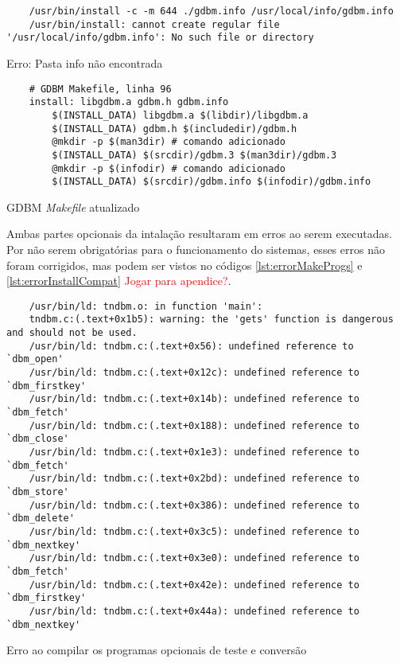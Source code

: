 \begin{listing}[!ht]
    \begin{verbatim}
    /usr/bin/install -c -m 644 ./gdbm.info /usr/local/info/gdbm.info
    /usr/bin/install: cannot create regular file '/usr/local/info/gdbm.info': No such file or directory
    \end{verbatim}
\caption{Erro: Pasta info não encontrada}
\label{lst:gdbmInfoErr}
\end{listing}

\begin{listing}[!ht]
    \begin{verbatim}
    # GDBM Makefile, linha 96
    install: libgdbm.a gdbm.h gdbm.info
        $(INSTALL_DATA) libgdbm.a $(libdir)/libgdbm.a
        $(INSTALL_DATA) gdbm.h $(includedir)/gdbm.h
        @mkdir -p $(man3dir) # comando adicionado
        $(INSTALL_DATA) $(srcdir)/gdbm.3 $(man3dir)/gdbm.3
        @mkdir -p $(infodir) # comando adicionado
        $(INSTALL_DATA) $(srcdir)/gdbm.info $(infodir)/gdbm.info
    \end{verbatim}
\caption{GDBM \textit{Makefile} atualizado}
\label{lst:gdbmMakefileUpt}
\end{listing}

Ambas partes opcionais da intalação resultaram em erros ao serem executadas. Por não serem obrigatórias 
para o funcionamento do sistemas, esses erros não foram corrigidos, mas podem ser vistos no códigos 
\ref{lst:errorMakeProgs} e \ref{lst:errorInstallCompat} \textcolor{red}{Jogar para apendice?}.

\begin{listing}[!ht]
    \begin{verbatim}
    /usr/bin/ld: tndbm.o: in function 'main':
    tndbm.c:(.text+0x1b5): warning: the 'gets' function is dangerous and should not be used.
    /usr/bin/ld: tndbm.c:(.text+0x56): undefined reference to `dbm_open'
    /usr/bin/ld: tndbm.c:(.text+0x12c): undefined reference to `dbm_firstkey'
    /usr/bin/ld: tndbm.c:(.text+0x14b): undefined reference to `dbm_fetch'
    /usr/bin/ld: tndbm.c:(.text+0x188): undefined reference to `dbm_close'
    /usr/bin/ld: tndbm.c:(.text+0x1e3): undefined reference to `dbm_fetch'
    /usr/bin/ld: tndbm.c:(.text+0x2bd): undefined reference to `dbm_store'
    /usr/bin/ld: tndbm.c:(.text+0x386): undefined reference to `dbm_delete'
    /usr/bin/ld: tndbm.c:(.text+0x3c5): undefined reference to `dbm_nextkey'
    /usr/bin/ld: tndbm.c:(.text+0x3e0): undefined reference to `dbm_fetch'
    /usr/bin/ld: tndbm.c:(.text+0x42e): undefined reference to `dbm_firstkey'
    /usr/bin/ld: tndbm.c:(.text+0x44a): undefined reference to `dbm_nextkey'
    \end{verbatim}
\caption{Erro ao compilar os programas opcionais de teste e conversão}
\label{lst:errorMakeProgs}
\end{listing}

